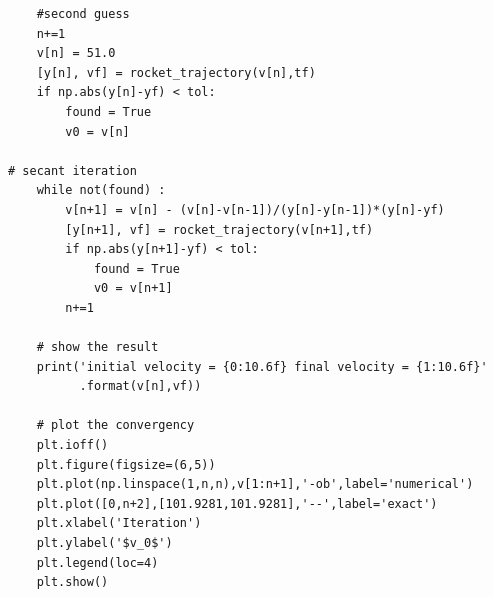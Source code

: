 \begin{verbatim}
    #second guess
    n+=1
    v[n] = 51.0
    [y[n], vf] = rocket_trajectory(v[n],tf)
    if np.abs(y[n]-yf) < tol:
        found = True
        v0 = v[n]

# secant iteration
    while not(found) :
        v[n+1] = v[n] - (v[n]-v[n-1])/(y[n]-y[n-1])*(y[n]-yf)
        [y[n+1], vf] = rocket_trajectory(v[n+1],tf)
        if np.abs(y[n+1]-yf) < tol:
            found = True
            v0 = v[n+1]
        n+=1

    # show the result
    print('initial velocity = {0:10.6f} final velocity = {1:10.6f}'
          .format(v[n],vf))

    # plot the convergency
    plt.ioff()
    plt.figure(figsize=(6,5))
    plt.plot(np.linspace(1,n,n),v[1:n+1],'-ob',label='numerical')
    plt.plot([0,n+2],[101.9281,101.9281],'--',label='exact')
    plt.xlabel('Iteration')
    plt.ylabel('$v_0$')
    plt.legend(loc=4)
    plt.show()
\end{verbatim}
\normalsize

